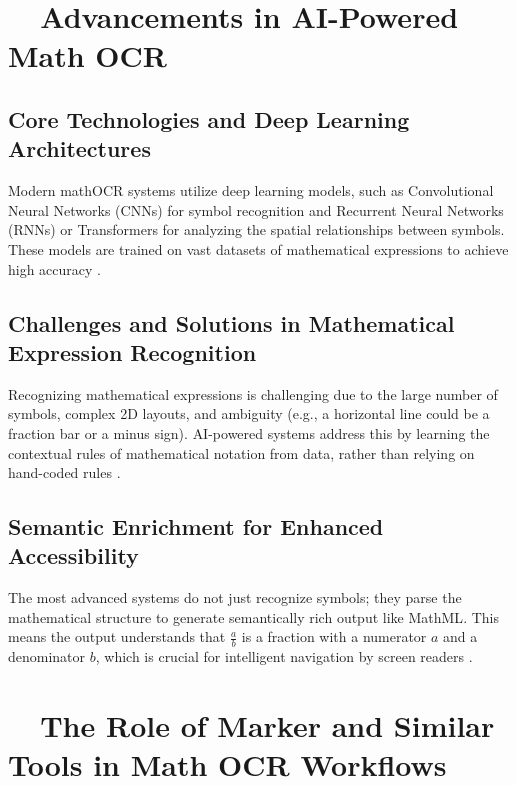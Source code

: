 \section{~~Advancements in AI-Powered Math OCR}\label{ch11:sec:ai-ocr-advancements}
\subsection{Core Technologies and Deep Learning Architectures}\label{ch11:ssec:core-tech}
Modern \gls{mathOCR} systems utilize deep learning models, such as Convolutional Neural Networks (CNNs) for symbol recognition and Recurrent Neural Networks (RNNs) or Transformers for analyzing the spatial relationships between symbols. These models are trained on vast datasets of mathematical expressions to achieve high accuracy \supercite{ArxivMER2203, ArxivMER2303}.

\subsection{Challenges and Solutions in Mathematical Expression Recognition}\label{ch11:ssec:challenges}
Recognizing mathematical expressions is challenging due to the large number of symbols, complex 2D layouts, and ambiguity (e.g., a horizontal line could be a fraction bar or a minus sign). \gls{AI}-powered systems address this by learning the contextual rules of mathematical notation from data, rather than relying on hand-coded rules \supercite{ResearchGateMathSVM, WorldScientificMathOCR}.

\subsection{Semantic Enrichment for Enhanced Accessibility}\label{ch11:ssec:semantic-enrichment}
The most advanced systems do not just recognize symbols; they parse the mathematical structure to generate semantically rich output like \gls{MathML}. This means the output understands that $\frac{a}{b}$ is a fraction with a numerator $a$ and a denominator $b$, which is crucial for intelligent navigation by screen readers \supercite{IBMSemanticAI, OntotextSemanticAI}.

\section{~~The Role of Marker and Similar Tools in Math OCR Workflows}\label{ch11:sec:marker}
